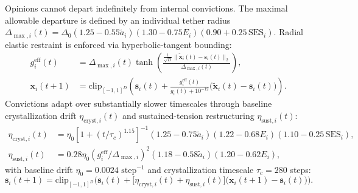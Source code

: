 \documentclass[11pt,a4paper]{article}
\begin{document}
Opinions cannot depart indefinitely from internal convictions. The maximal allowable departure is defined by an individual tether radius $\Delta_{\max, i}(t) = \Delta_0 (1.25 - 0.55\tilde{a}_i)(1.30 - 0.75 E_i)(0.90 + 0.25\,\mathrm{SES}_i)$. Radial elastic restraint is enforced via hyperbolic-tangent bounding:
\begin{align}
    g_i^{\mathrm{eff}}(t) &= \Delta_{\max, i}(t) \tanh\!\left(\frac{\frac{1}{\sqrt{D}}\|\tilde{\mathbf{x}}_i(t) - \mathbf{s}_i(t)\|_2}{\Delta_{\max, i}(t)}\right), \label{eq:methods_tether_radius} \\
    \mathbf{x}_i(t+1) &= \mathrm{clip}_{[-1, 1]^D}\!\left(\mathbf{s}_i(t) + \frac{g_i^{\mathrm{eff}}(t)}{g_i(t) + 10^{-12}}\big(\tilde{\mathbf{x}}_i(t) - \mathbf{s}_i(t)\big)\right). \label{eq:methods_tether_update}
\end{align}
Convictions adapt over substantially slower timescales through baseline crystallization drift $\eta_{\mathrm{cryst}, i}(t)$ and sustained-tension restructuring $\eta_{\mathrm{sust}, i}(t)$:
\begin{align}
    \eta_{\mathrm{cryst}, i}(t) &= \eta_0 [1 + (t/\tau_c)^{1.15}]^{-1}(1.25 - 0.75\tilde{a}_i)(1.22 - 0.68 E_i)(1.10 - 0.25\,\mathrm{SES}_i), \label{eq:methods_cryst} \\
    \eta_{\mathrm{sust}, i}(t) &= 0.28\eta_0 (g_i^{\mathrm{eff}} / \Delta_{\max, i})^2(1.18 - 0.58\tilde{a}_i)(1.20 - 0.62 E_i), \label{eq:methods_sust}
\end{align}
with baseline drift $\eta_0 = 0.0024 \text{ step}^{-1}$ and crystallization timescale $\tau_c = 280$ steps:
\begin{equation}
    \mathbf{s}_i(t+1) = \mathrm{clip}_{[-1, 1]^D}\!\Big(\mathbf{s}_i(t) + \big[\eta_{\mathrm{cryst}, i}(t) + \eta_{\mathrm{sust}, i}(t)\big]\big(\mathbf{x}_i(t+1) - \mathbf{s}_i(t)\big)\Big).
    \label{eq:methods_conviction}
\end{equation}
\end{document}
